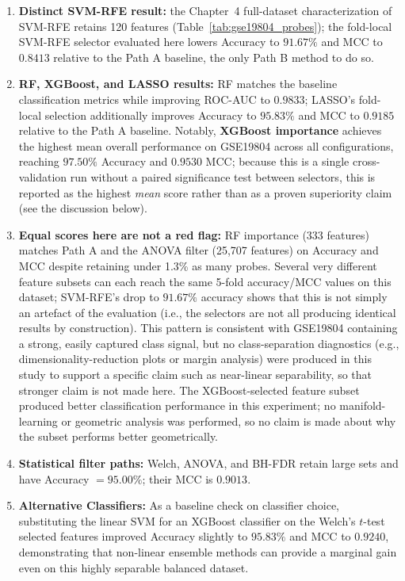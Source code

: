 \begin{enumerate}
    \item \textbf{Distinct SVM-RFE result:} the Chapter~4 full-dataset characterization of SVM-RFE retains 120 features (Table~\ref{tab:gse19804_probes}); the fold-local SVM-RFE selector evaluated here lowers Accuracy to $91.67\%$ and MCC to $0.8413$ relative to the Path A baseline, the only Path B method to do so.
    \item \textbf{RF, XGBoost, and LASSO results:} RF matches the baseline classification metrics while improving ROC-AUC to $0.9833$; LASSO's fold-local selection additionally improves Accuracy to $95.83\%$ and MCC to $0.9185$ relative to the Path A baseline. Notably, \textbf{XGBoost importance} achieves the highest mean overall performance on GSE19804 across all configurations, reaching $97.50\%$ Accuracy and $0.9530$ MCC; because this is a single cross-validation run without a paired significance test between selectors, this is reported as the highest \emph{mean} score rather than as a proven superiority claim (see the discussion below).
    \item \textbf{Equal scores here are not a red flag:} RF importance (333 features) matches Path A and the ANOVA filter (25,707 features) on Accuracy and MCC despite retaining under 1.3\% as many probes. Several very different feature subsets can each reach the same 5-fold accuracy/MCC values on this dataset; SVM-RFE's drop to $91.67\%$ accuracy shows that this is not simply an artefact of the evaluation (i.e., the selectors are not all producing identical results by construction). This pattern is consistent with GSE19804 containing a strong, easily captured class signal, but no class-separation diagnostics (e.g., dimensionality-reduction plots or margin analysis) were produced in this study to support a specific claim such as near-linear separability, so that stronger claim is not made here. The XGBoost-selected feature subset produced better classification performance in this experiment; no manifold-learning or geometric analysis was performed, so no claim is made about why the subset performs better geometrically.
    \item \textbf{Statistical filter paths:} Welch, ANOVA, and BH-FDR retain large sets and have Accuracy $=95.00\%$; their MCC is $0.9013$.
    \item \textbf{Alternative Classifiers:} As a baseline check on classifier choice, substituting the linear SVM for an XGBoost classifier on the Welch's $t$-test selected features improved Accuracy slightly to $95.83\%$ and MCC to $0.9240$, demonstrating that non-linear ensemble methods can provide a marginal gain even on this highly separable balanced dataset.

\end{enumerate}
